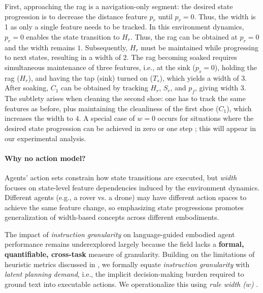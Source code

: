 \documentclass[11pt]{article}
\begin{document}


First, approaching the rag is a navigation-only segment: the desired state progression is to decrease the distance feature $p_r$ until $p_r=0$. Thus, the width is 1 as only a single feature needs to be tracked. In this environment dynamics, $p_r=0$ enables the state transition to $H_r$. Thus, the rag can be obtained at $p_r=0$ and the width remains $1$. Subsequently, $H_r$ must be maintained while progressing to next states, resulting in a width of $2$. The rag becoming soaked requires simultaneous maintenance of three features, i.e., at the sink ($p_s=0$), holding the rag ($H_r$), and having the tap (sink) turned on ($T_s$), which yields a width of $3$. After soaking, $C_1$ can be obtained by tracking $H_r$, $S_r$, and $p_f$, giving width 3. The subtlety arises when cleaning the second shoe: one has to track the same features as before, plus maintaining the cleanliness of the first shoe ($C_1$), which increases the width to $4$. A special case of $w=0$ occurs for situations where the desired state progression can be achieved in zero or one step \citep{bonet2024general}; this will appear in our experimental analysis.


\paragraph{Why no action model?}
Agents' action sets constrain how state transitions are executed, but \emph{width} focuses on state-level feature dependencies induced by the environment dynamics. Different agents (e.g., a rover vs. a drone) may have different action spaces to achieve the same feature change, so emphasizing state progressions promotes generalization of width-based concepts across different embodiments.



The impact of \emph{instruction granularity} on language-guided embodied agent performance remains underexplored largely because the field lacks a \textbf{formal, quantifiable, cross-task} measure of granularity. Building on the limitations of heuristic metrics discussed in , we formally equate \emph{instruction granularity} with \emph{latent planning demand}, i.e., the implicit decision-making burden required to ground text into executable actions. We operationalize this using \emph{rule width ($w$)} \citep{DBLP:journals/jair/DrexlerSG24}. 
\end{document}
